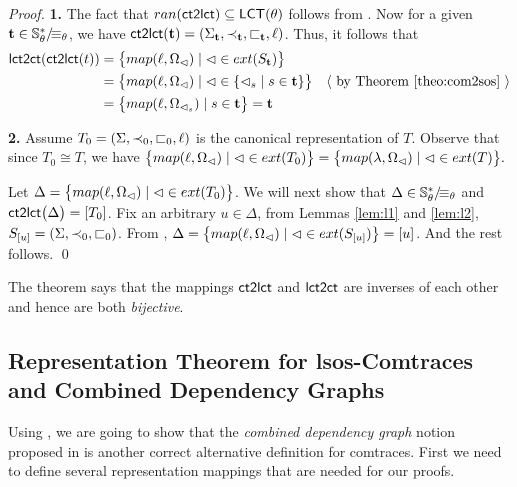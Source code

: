 \documentclass{llncs}
\begin{document}
\begin{proof}\textbf{1. } The fact that $ran(\mathsf{ct2lct})\subseteq \mathsf{LCT}(\theta)$ follows from . Now for a given $\mathbf{t}\in {\mathbb{S}_\theta^*}/\!{\equiv_{\theta}}$,  we have $\mathsf{ct2lct}(\mathbf{t})=(\Sigma_{\mathbf{t}},\prec_{\mathbf{t}},\sqsubset_{\mathbf{t}},\ell)$. Thus, it follows that
\begin{align*}
\lc(\cl(t))	& = \bset{map(\ell,\Omega_\lhd)\mid \lhd \in ext(S_\mathbf{t})} 	& \\
		& = \bset{map(\ell,\Omega_\lhd)\mid \lhd \in \set{\lhd_s\mid s\in \mathbf{t}}}	&\ttcomment{\text{by \theoref{com2sos}}}\\
		& = \bset{map(\ell,\Omega_{\lhd_{s}})\mid s\in \mathbf{t}}	  = \mathbf{t}	&
\end{align*} 

\textbf{2. }  Assume $T_{0}=(\Sigma,\prec_{0},\sqsubset_{0},\ell)$ is the canonical representation of $T$. Observe that since $T_0\cong T$, we have $\bigl\{map(\ell,\Omega_\lhd)\mid \lhd \in ext(T_0)\bigr\} = \bigl\{map(\lambda,\Omega_\lhd)\mid \lhd \in ext(T)\bigr\}.$

Let $\Delta = \bigl\{map(\ell,\Omega_\lhd)\mid \lhd \in ext(T_0)\bigr\}$. We will next show that $\Delta\in {\mathbb{S}_\theta^*}/\!{\equiv_{\theta}}$ and  $\mathsf{ct2lct}\bigl(\Delta\bigr) = \left[ T_0 \right]$. Fix an arbitrary $u\in\Delta$, from Lemmas \ref{lem:l1} and \ref{lem:l2},  $S_{[u]} = (\Sigma,\prec_{0},\sqsubset_{0})$. From , $\Delta =  \bigl\{map(\ell,\Omega_\lhd)\mid \lhd \in ext(S_{[u]})\bigr\} = [u]$. And the rest follows. \qed
\end{proof}

The theorem says that the mappings $\mathsf{ct2lct}$ and $\mathsf{lct2ct}$ are inverses of each other and hence are both \emph{bijective}. 


\subsection{Representation Theorem for lsos-Comtraces and Combined Dependency Graphs}
Using , we are going to show that the \emph{combined dependency graph} notion proposed in \cite{KK08} is another correct alternative definition for comtraces. First we need to define several  representation mappings  that are needed for our proofs.
\end{document}
